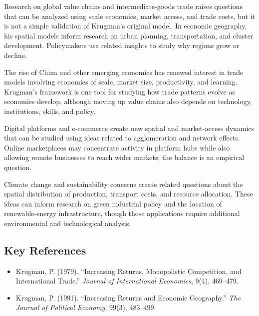 Research on global value chains and intermediate-goods trade raises questions
that can be analyzed using scale economies, market access, and trade costs, but
it is not a simple validation of Krugman's original model. In economic geography,
his spatial models inform research on urban planning, transportation, and cluster
development. Policymakers use related insights to study why regions grow or
decline.

The rise of China and other emerging economies has renewed interest in trade
models involving economies of scale, market size, productivity, and learning.
Krugman's framework is one tool for studying how trade patterns evolve as
economies develop, although moving up value chains also depends on technology,
institutions, skills, and policy.

Digital platforms and e-commerce create new spatial and market-access dynamics
that can be studied using ideas related to agglomeration and network effects.
Online marketplaces may concentrate activity in platform hubs while also allowing
remote businesses to reach wider markets; the balance is an empirical question.

Climate change and sustainability concerns create related questions about the
spatial distribution of production, transport costs, and resource allocation.
These ideas can inform research on green industrial policy and the location of
renewable-energy infrastructure, though those applications require additional
environmental and technological analysis.

\subsection*{Key References}
\begin{itemize}
    \item Krugman, P. (1979). ``Increasing Returns, Monopolistic Competition, and International Trade.'' \textit{Journal of International Economics}, 9(4), 469--479.
    \item Krugman, P. (1991). ``Increasing Returns and Economic Geography.'' \textit{The Journal of Political Economy}, 99(3), 483--499.
\end{itemize}
